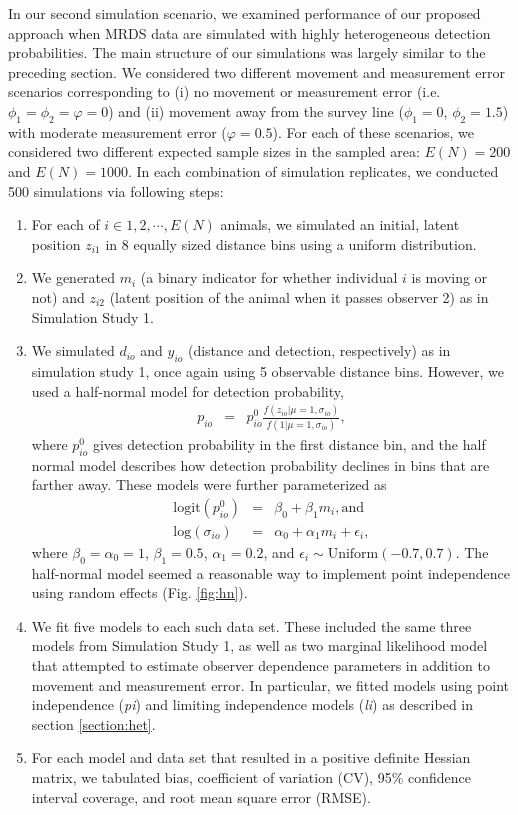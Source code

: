 \documentclass[aoas,preprint]{imsart}
\numberwithin{equation}{section}
\theoremstyle{plain}
\begin{document}
In our second simulation scenario, we examined performance of our proposed approach when MRDS data are simulated with highly heterogeneous detection probabilities.  The main structure of our simulations was largely similar to the preceding section.  We considered two different movement and measurement error scenarios corresponding to (i) no movement or measurement error (i.e. $\phi_1=\phi_2=\varphi=0$) and (ii) movement away from the survey line ($\phi_1=0$, $\phi_2=1.5$) with moderate measurement error ($\varphi=0.5$). For each of these scenarios, we considered two different expected sample sizes in the sampled area: $E(N) = 200$ and $E(N)=1000$.  In each combination of simulation replicates, we conducted 500 simulations via following steps:
\begin{enumerate}
  \item For each of $i \in 1,2,\cdots,E(N)$ animals, we simulated an initial, latent position $z_{i1}$ in 8 equally sized distance bins using a uniform distribution.
  \item We generated $m_i$ (a binary indicator for whether individual $i$ is moving or not) and $z_{i2}$ (latent position of the animal when it passes observer 2) as in Simulation Study 1.
  \item We simulated $d_{io}$ and $y_{io}$ (distance and detection, respectively) as in simulation study 1, once again using 5 observable distance bins. However, we used a half-normal model for detection probability,
      \begin{eqnarray*}
        p_{io} & = & p_{io}^0 \frac{f(z_{io}|\mu=1,\sigma_{io})}{f(1|\mu=1,\sigma_{io})},
      \end{eqnarray*}
      where $p_{io}^0$ gives detection probability in the first distance bin, and the half normal model describes how detection probability declines in bins that are farther away. These models were further parameterized as
      \begin{eqnarray*}
        \text{logit}(p_{io}^0) & = & \beta_0 + \beta_1 m_i, \text{and} \\
        \text{log}(\sigma_{io}) & = & \alpha_0 + \alpha_1 m_i + \epsilon_i,
      \end{eqnarray*}
      where $\beta_0 = \alpha_0 = 1$, $\beta_1 = 0.5$, $\alpha_1 = 0.2$, and $\epsilon_i \sim \text{Uniform}(-0.7,0.7)$.  The half-normal model seemed a reasonable way to implement point independence \citep{LaakeBorchers2004} using random effects (Fig. \ref{fig:hn}).
  \item We fit five models to each such data set.  These included the same three models from Simulation Study 1, as well as two marginal likelihood model that attempted to estimate observer dependence parameters in addition to movement and measurement error.  In particular, we fitted models using point independence (\textit{pi}) and limiting independence models (\textit{li}) as described in section \ref{section:het}. \\
  \item For each model and data set that resulted in a positive definite Hessian matrix, we tabulated bias, coefficient of variation (CV), 95\% confidence interval coverage, and root mean square error (RMSE).
\end{enumerate}
\end{document}
